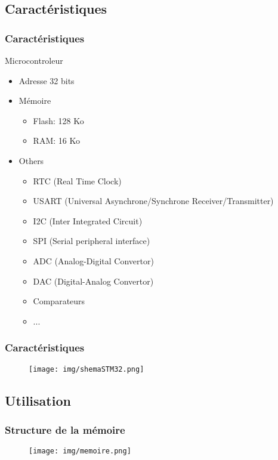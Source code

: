 \documentclass{beamer}
\begin{document}
		\subsection{Caractéristiques}
			\begin{frame}
				\frametitle{Caractéristiques}
				Microcontroleur
				\begin{itemize}
					\item Adresse 32 bits
					\item Mémoire
						\begin{itemize}
							\item Flash: 128 Ko
							\item RAM: 16 Ko
						\end{itemize}
					\item Others
						\begin{itemize}
							\item RTC (Real Time Clock)
							\item USART (Universal Asynchrone/Synchrone Receiver/Transmitter)
							\item I2C (Inter Integrated Circuit)
							\item SPI (Serial peripheral interface)
							\item ADC (Analog-Digital Convertor)
							\item DAC (Digital-Analog Convertor)
							\item Comparateurs
							\item ...
						\end{itemize}
				\end{itemize}
			\end{frame}
			
			\begin{frame}
				\frametitle{Caractéristiques}
				\begin{figure}
					\texttt{[image: img/shemaSTM32.png]}
				\end{figure}
			\end{frame}
			
			
		\subsection{Utilisation}
			\begin{frame}
				\frametitle{Structure de la mémoire}
				\begin{figure}
					\texttt{[image: img/memoire.png]}
				\end{figure}
			\end{frame}
			
\end{document}
